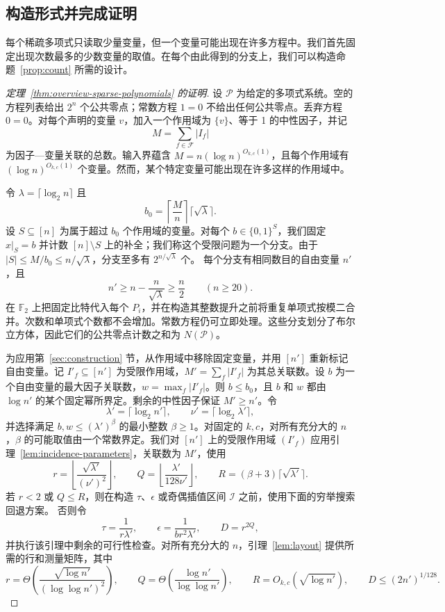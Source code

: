 \documentclass[11pt,reqno]{amsart}
\numberwithin{equation}{section}
\theoremstyle{definition}\newtheorem{definition}[theorem]{定义}
\theoremstyle{remark}\newtheorem{remark}[theorem]{注}
\renewcommand{\le}{\leqslant}
\renewcommand{\ge}{\geqslant}
\begin{document}
\subsection{构造形式并完成证明}\label{subsec:sparse-queries}
每个稀疏多项式只读取少量变量，但一个变量可能出现在许多方程中。我们首先固定出现次数最多的少数变量的取值。在每个由此得到的分支上，我们可以构造命题~\ref{prop:count} 所需的设计。

\begin{proof}[定理~\ref{thm:overview-sparse-polynomials} 的证明]
设 $\mathcal P$ 为给定的多项式系统。空的方程列表给出 $2^n$ 个公共零点；常数方程 $1=0$ 不给出任何公共零点。丢弃方程 $0=0$。对每个声明的变量 $v$，加入一个作用域为 $\{v\}$、等于 1 的中性因子，并记
\[
 M=\sum_{f\in\mathcal F}|I_f|
\]
为因子—变量关联的总数。输入界蕴含 $M=n(\log n)^{O_{k,c}(1)}$，且每个作用域有 $(\log n)^{O_{k,c}(1)}$ 个变量。然而，某个特定变量可能出现在许多这样的作用域中。

令 $\lambda=\lceil\log_2 n\rceil$ 且
\[
 b_0=\left\lceil\frac Mn\right\rceil\lceil\sqrt\lambda\rceil.
\]
设 $S\subseteq[n]$ 为属于超过 $b_0$ 个作用域的变量。对每个 $b\in\{0,1\}^S$，我们固定 $x|_S=b$ 并计数 $[n]\setminus S$ 上的补全；我们称这个受限问题为一个分支。由于 $|S|\le M/b_0\le n/\sqrt\lambda$，分支至多有 $2^{n/\sqrt\lambda}$ 个。
每个分支有相同数目的自由变量 $n'$，且
\[
 n'\ge n-\frac n{\sqrt\lambda}\ge\frac n2
 \qquad(n\ge20).
\]
在 $\mathbb F_2$ 上把固定比特代入每个 $P_i$，并在构造其整数提升之前将重复单项式按模二合并。次数和单项式个数都不会增加。常数方程仍可立即处理。这些分支划分了布尔立方体，因此它们的公共零点计数之和为 $N(\mathcal P)$。

为应用第~\ref{sec:construction} 节，从作用域中移除固定变量，并用 $[n']$ 重新标记自由变量。记 $I'_f\subseteq[n']$ 为受限作用域，$M'=\sum_f|I'_f|$ 为其总关联数。设 $b$ 为一个自由变量的最大因子关联数，$w=\max_f|I'_f|$。则 $b\le b_0$，且 $b$ 和 $w$ 都由 $\log n'$ 的某个固定幂所界定。剩余的中性因子保证 $M'\ge n'$。令
\[
 \lambda'=\lceil\log_2 n'\rceil,\qquad
 \nu'=\lceil\log_2\lambda'\rceil,
\]
并选择满足 $b,w\le(\lambda')^\beta$ 的最小整数 $\beta\ge1$。对固定的 $k,c$，对所有充分大的 $n$，$\beta$ 的可能取值由一个常数界定。我们对 $[n']$ 上的受限作用域 $(I'_f)$ 应用引理~\ref{lem:incidence-parameters}，关联数为 $M'$，使用
\[
 r=\left\lfloor\frac{\sqrt{\lambda'}}{(\nu')^2}\right\rfloor,
 \qquad Q=\left\lfloor\frac{\lambda'}{128\nu'}\right\rfloor,
 \qquad R=(\beta+3)\lceil\sqrt{\lambda'}\rceil.
\]
若 $r<2$ 或 $Q\le R$，则在构造 $\tau$、$\epsilon$ 或奇偶插值区间 $\mathcal I$ 之前，使用下面的穷举搜索回退方案。
否则令
\[
 \tau=\frac1{r\lambda'},\qquad
 \epsilon=\frac1{br^2\lambda'},\qquad D=r^{2Q},
\]
并执行该引理中剩余的可行性检查。对所有充分大的 $n$，引理~\ref{lem:layout} 提供所需的行和测量矩阵，其中
\[
 r=\Theta\!\left(\frac{\sqrt{\log n'}}{(\log\log n')^2}\right),
 \qquad Q=\Theta\!\left(\frac{\log n'}{\log\log n'}\right),
 \qquad R=O_{k,c}(\sqrt{\log n'}),
 \qquad D\le(2n')^{1/128}.
\]


\end{proof}
\end{document}

